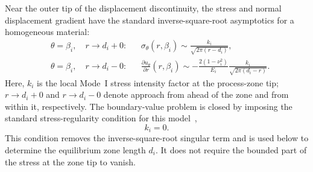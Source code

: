 Near the outer tip of the displacement discontinuity, the stress and normal
displacement gradient have the standard inverse-square-root asymptotics for a
homogeneous material:
\begin{equation}
\label{eq:zone-tip-asymptotics}
\begin{aligned}
  &\theta=\beta_i,\quad r\to d_i+0:
  &&\sigma_\theta(r,\beta_i)
    \sim \frac{k_i}{\sqrt{2\pi(r-d_i)}},\\[3pt]
  &\theta=\beta_i,\quad r\to d_i-0:
  &&\frac{\partial u_\theta}{\partial r}(r,\beta_i)
    \sim -\frac{2(1-\nu_i^2)}{E_i}
    \frac{k_i}{\sqrt{2\pi(d_i-r)}}.
\end{aligned}
\end{equation}
Here, $k_i$ is the local Mode~I stress intensity factor at the process-zone
tip; $r\to d_i+0$ and $r\to d_i-0$ denote approach from ahead of the
zone and from within it, respectively. The boundary-value problem is closed by
imposing the standard stress-regularity condition for this
model~\cite{KaminskyDudykPolishchuk2024},
\begin{equation*}
  k_i=0.
\end{equation*}
This condition removes the inverse-square-root singular term and is
used below to determine the equilibrium zone length $d_i$. It does not
require the bounded part of the stress at the zone tip to vanish.
